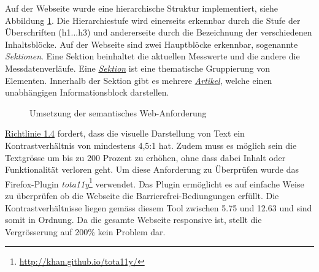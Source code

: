 Auf der Webseite wurde eine hierarchische Struktur implementiert, siehe Abbildung \ref{img:semWeb}. Die Hierarchiestufe wird einerseits erkennbar durch die Stufe der Überschriften (h1...h3) und andererseite durch die Bezeichnung der verschiedenen Inhaltsblöcke. Auf der Webseite sind zwei Hauptblöcke erkennbar, sogenannte \textit{Sektionen}. Eine Sektion beinhaltet die aktuellen Messwerte und die andere die Messdatenverläufe. Eine \href{https://www.w3.org/TR/2011/WD-html5-20110525/sections.html#the-section-element}{\textit{Sektion}} ist eine thematische Gruppierung von Elementen. Innerhalb der Sektion gibt es mehrere \href{https://www.w3.org/TR/2011/WD-html5-20110525/sections.html#the-article-element}{\textit{Artikel}}, welche einen unabhängigen Informationsblock darstellen.

\begin{figure}[h!]
	\centering
	\caption{Umsetzung der semantisches Web-Anforderung}
	\label{img:semWeb}
\end{figure}

\noindent
\href{https://www.w3.org/Translations/WCAG20-de/#visual-audio-contrast}{Richtlinie 1.4} fordert, dass die visuelle Darstellung von Text ein Kontrastverhältnis von mindestens 4,5:1 hat. Zudem muss es möglich sein die Textgrösse um bis zu 200 Prozent zu erhöhen, ohne dass dabei Inhalt oder Funktionalität verloren geht. Um diese Anforderung zu Überprüfen wurde das Firefox-Plugin \textit{tota11y}\footnote{\url{http://khan.github.io/tota11y/}} verwendet. Das Plugin ermöglicht es auf einfache Weise zu überprüfen ob die Webseite die Barrierefrei-Bediungungen erfüllt. Die Kontrastverhältnisse liegen gemäss diesem Tool zwischen 5.75 und 12.63 und sind somit in Ordnung. Da die gesamte Webseite responsive ist, stellt die Vergrösserung auf 200\% kein Problem dar.


